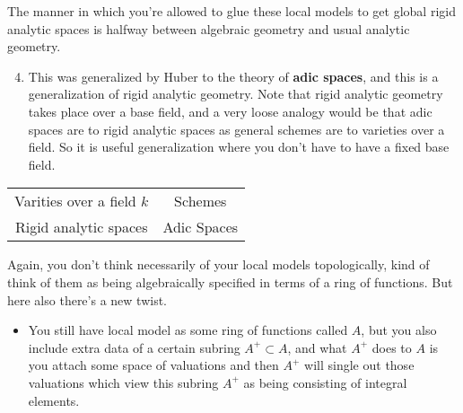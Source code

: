 The manner in which you're allowed to glue these local models to get global rigid analytic spaces is halfway between algebraic geometry and usual analytic geometry.


\begin{enumerate}
    \setcounter{enumi}{3} 

    \item This was generalized by Huber to the theory of \textbf{adic spaces}, and this is a generalization of rigid analytic geometry. Note that rigid analytic geometry takes place over a base field, and a very loose analogy would be that adic spaces are to rigid analytic spaces as general schemes are to varieties over a field. So it is useful generalization where you don't have to have a fixed base field.
\end{enumerate}

\begin{center}
\begin{tabular}{ |c|c| } 
 \hline
 Varities over a field $k$ & Schemes \\ 
 Rigid analytic spaces & Adic Spaces \\ 

 \hline
\end{tabular}
\end{center}


Again, you don't think necessarily of your local models topologically, kind of think of them as being algebraically specified in terms of a ring of functions. But here also there's a new twist. 

\begin{itemize}
    \item  You still have local model as some ring of functions called $A$, but you also include extra data of a certain subring $A^+ \subset A $, and what $A^{+}$ does to $A$ is you attach some space of valuations and then $A^+$ will single out those valuations which view this subring $A^+$ as being consisting of integral elements.
\end{itemize}


